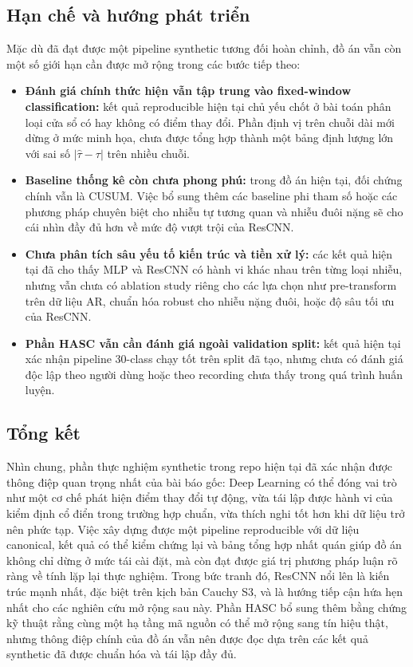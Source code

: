 \subsection*{Hạn chế và hướng phát triển}
Mặc dù đã đạt được một pipeline synthetic tương đối hoàn chỉnh, 
đồ án vẫn còn một số giới hạn cần được mở rộng trong các bước tiếp theo:
\begin{itemize}
    \item \textbf{Đánh giá chính thức hiện vẫn tập trung vào fixed-window classification:} kết quả reproducible 
    hiện tại chủ yếu chốt ở bài toán phân loại cửa sổ có hay không có điểm thay đổi. 
    Phần định vị trên chuỗi dài mới dừng ở mức minh họa, chưa được tổng hợp thành một bảng định 
    lượng lớn với sai số $|\hat{\tau} - \tau|$ trên nhiều chuỗi.
    \item \textbf{Baseline thống kê còn chưa phong phú:} trong đồ án hiện tại, 
    đối chứng chính vẫn là CUSUM. Việc bổ sung thêm các baseline phi tham số hoặc các phương pháp chuyên 
    biệt cho nhiễu tự tương quan và nhiễu đuôi nặng sẽ cho cái nhìn đầy đủ hơn về mức độ vượt trội của ResCNN.
    \item \textbf{Chưa phân tích sâu yếu tố kiến trúc và tiền xử lý:} các kết quả hiện tại đã cho thấy MLP và ResCNN có hành vi khác 
    nhau trên từng loại nhiễu, nhưng vẫn chưa có ablation study riêng cho các lựa chọn như pre-transform 
    trên dữ liệu AR, chuẩn hóa robust cho nhiễu nặng đuôi, hoặc độ sâu tối ưu của ResCNN.
    \item \textbf{Phần HASC vẫn cần đánh giá ngoài validation split:} kết quả hiện tại xác nhận pipeline 30-class chạy tốt trên split đã tạo,
    nhưng chưa có đánh giá độc lập theo người dùng hoặc theo recording chưa thấy trong quá trình huấn luyện.
\end{itemize}

\subsection*{Tổng kết}
Nhìn chung, phần thực nghiệm synthetic trong repo hiện tại đã xác nhận được thông điệp 
quan trọng nhất của bài báo gốc: Deep Learning có thể đóng vai trò như một cơ chế phát hiện điểm thay đổi 
tự động, vừa tái lập được hành vi của kiểm định cổ điển trong trường hợp chuẩn, 
vừa thích nghi tốt hơn khi dữ liệu trở nên phức tạp. 
Việc xây dựng được một pipeline reproducible với dữ liệu canonical, 
kết quả có thể kiểm chứng lại và bảng tổng hợp nhất quán giúp đồ án không chỉ dừng ở mức tái cài đặt, 
mà còn đạt được giá trị phương pháp luận rõ ràng về tính lặp lại thực nghiệm. 
Trong bức tranh đó, ResCNN nổi lên là kiến trúc mạnh nhất, đặc biệt trên kịch bản Cauchy S3, 
và là hướng tiếp cận hứa hẹn nhất cho các nghiên cứu mở rộng sau này. 
Phần HASC bổ sung thêm bằng chứng kỹ thuật rằng cùng một hạ tầng mã nguồn có thể mở rộng sang tín hiệu thật, 
nhưng thông điệp chính của đồ án vẫn nên được đọc dựa trên các kết quả synthetic đã được chuẩn hóa và tái lập đầy đủ.
